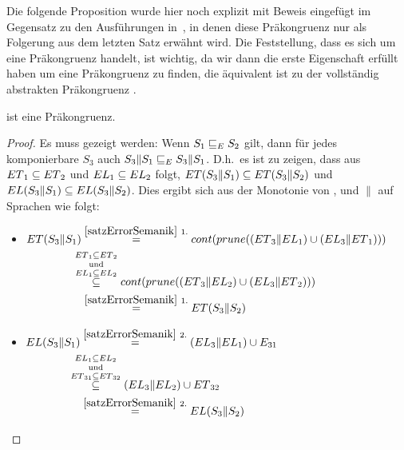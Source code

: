 Die folgende Proposition wurde hier noch explizit mit Beweis eingefügt im
Gegensatz zu den Ausführungen in~\cite{Vogler2014EIO}, in denen diese
Präkongruenz nur als Folgerung aus dem letzten Satz erwähnt wird. Die
Feststellung, dass es sich um eine Präkongruenz handelt, ist wichtig, da wir
dann die erste Eigenschaft erfüllt haben um eine Präkongruenz zu finden, die
äquivalent ist zu der vollständig abstrakten Präkongruenz \ECRel{}.

\begin{prop}[Präkongruenz]
  \label{korPraekongruenz}
  \ERel{} ist eine Präkongruenz.
\end{prop}

\begin{proof}
  Es muss gezeigt werden: Wenn $S_1\sqsubseteq _E S_2$ gilt, dann für jedes
  komponierbare $S_3$ auch $S_3\|S_1\sqsubseteq _E S_3\|S_1$. D.h.\ es ist zu zeigen,
  dass aus $ET{}_1\subseteq ET{}_2$ und $EL{}_1\subseteq EL{}_2$ folgt,
  $ET{}(S_3\|S_1)\subseteq ET{}(S_3\|S_2)$ und $EL{}(S_3\|S_1)\subseteq
  EL{}(S_3\|S_2)$. Dies ergibt sich aus der Monotonie von \cont{}, \prune{}
  und $\|$ auf Sprachen wie folgt:\\
  \begin{itemize}
    \item $\begin{aligned}[t]
        \ET{}(S_3\|S_1) &\overset{\ref{satzErrorSemanik}~1.}{=}
      \cont{}(\prune{}((\ET{}_3\|\EL{}_1)\cup (\EL{}_3\|\ET{}_1)))\\
      &\hspace{-0.3cm}\overset{\ET{}_1\subseteq
    \ET{}_2}{\overset{\mathrm{und}}{\overset{\EL{}_1\subseteq \EL{}_2}{\subseteq}}}
    \cont{}(\prune{}((\ET{}_3\|\EL{}_2)\cup (\EL{}_3\|\ET{}_2)))\\
      &\overset{\ref{satzErrorSemanik}~1.}{=} \ET{}(S_3\|S_2)
    \end{aligned}$
    \item $\begin{aligned}[t]
        \EL{}(S_3\|S_1) &\overset{\ref{satzErrorSemanik}~2.}{=} (\EL{}_3\|\EL{}_1)\cup
        E_{31}\\
        &\hspace{-0.4cm}\overset{\EL{}_1\subseteq
      \EL{}_2}{\overset{\mathrm{und}}{\overset{\ET{}_{31}\subseteq
      \ET{}_{32}}{\subseteq}}} (\EL{}_3\|\EL{}_2)\cup \ET{}_{32}\\
      &\overset{\ref{satzErrorSemanik}~2.}{=} \EL{}(S_3\|S_2)
    \end{aligned}$
  \end{itemize}
\end{proof}

